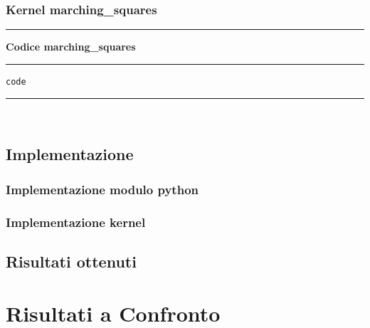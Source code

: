 \documentclass[12pt,a4paper]{report}
\begin{document}
\subsection{Kernel marching\_squares}

\noindent\rule[0.5ex]{\linewidth}{2pt}
\small{\textbf{Codice marching\_squares } \\
\noindent\rule[0.5ex]{\linewidth}{1pt}
\begin{lstlisting}
code
\end{lstlisting}
\noindent\rule[0.5ex]{\linewidth}{1pt} \\[10pt]




\newpage
\section{Implementazione}
\subsection{Implementazione modulo python}
\subsection{Implementazione kernel}

\section{Risultati ottenuti}


\chapter{Risultati a Confronto}

}
\end{document}

